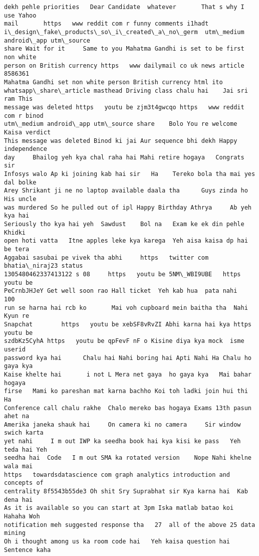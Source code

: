 \documentclass[11pt]{article}
\begin{document}
\begin{tcolorbox}[breakable, size=fbox, boxrule=.5pt, pad at break*=1mm, opacityfill=0]
\begin{Verbatim}[commandchars=\\\{\}]
dekh pehle priorities   Dear Candidate  whatever       That s why I use Yahoo
mail       https   www reddit com r funny comments i1hadt
i\_design\_fake\_products\_so\_i\_created\_a\_no\_germ  utm\_medium android\_app utm\_source
share Wait for it     Same to you Mahatma Gandhi is set to be first non white
person on British currency https   www dailymail co uk news article 8586361
Mahatma Gandhi set non white person British currency html ito
whatsapp\_share\_article masthead Driving class chalu hai    Jai sri ram This
message was deleted https   youtu be zjm3t4gwcqo https   www reddit com r binod
utm\_medium android\_app utm\_source share    Bolo You re welcome   Kaisa verdict
This message was deleted Binod ki jai Aur sequence bhi dekh Happy independence
day     Bhailog yeh kya chal raha hai Mahi retire hogaya   Congrats sir
Infosys walo Ap ki joining kab hai sir   Ha    Tereko bola tha mai yes dal bolke
Arey Shrikant ji ne no laptop available daala tha      Guys zinda ho  His uncle
was murdered So he pulled out of ipl Happy Birthday Athrya     Ab yeh kya hai
Seriously tho kya hai yeh  Sawdust    Bol na   Exam ke ek din pehle     Khidki
open hoti vatta   Itne apples leke kya karega  Yeh aisa kaisa dp hai be tera
Aggabai sasubai pe vivek tha abhi     https   twitter com bhatia\_niraj23 status
1305480462337413122 s 08     https   youtu be 5NM\_WBI9UBE   https   youtu be
PeCrnbJHJeY Get well soon rao Hall ticket  Yeh kab hua  pata nahi           100
run se harna hai rcb ko       Mai voh cupboard mein baitha tha  Nahi   Kyun re
Snapchat        https   youtu be xebSF8vRvZI Abhi karna hai kya https   youtu be
szdbKz5CyhA https   youtu be qpFevF nF o Kisine diya kya mock  isme userid
password kya hai      Chalu hai Nahi boring hai Apti Nahi Ha Chalu ho gaya kya
Kaise khelte hai       i not L Mera net gaya  ho gaya kya   Mai bahar hogaya
firse   Mami ko pareshan mat karna bachho Koi toh ladki join hui thi    Ha
Conference call chalu rakhe  Chalo mereko bas hogaya Exams 13th pasun ahet na
Amerika janeka shauk hai     On camera ki no camera     Sir window swich karta
yet nahi     I m out IWP ka seedha book hai kya kisi ke pass   Yeh teda hai Yeh
seedha hai  Code   I m out SMA ka rotated version    Nope Nahi khelne wala mai
https   towardsdatascience com graph analytics introduction and concepts of
centrality 8f5543b55de3 Oh shit Sry Suprabhat sir Kya karna hai  Kab dena hai
As it is available so you can start at 3pm Iska matlab batao koi Hahaha Woh
notification meh suggested response tha   27  all of the above 25 data mining
Oh i thought among us ka room code hai   Yeh kaisa question hai  Sentence kaha

\end{Verbatim}
\end{tcolorbox}
\end{document}
